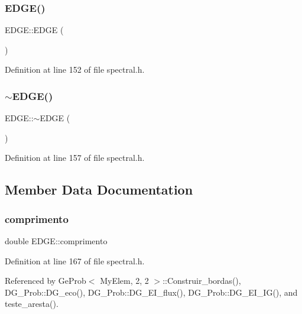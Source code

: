 \subsubsection{\texorpdfstring{E\+D\+G\+E()}{EDGE()}}
{\footnotesize\ttfamily E\+D\+G\+E\+::\+E\+D\+GE (\begin{DoxyParamCaption}{ }\end{DoxyParamCaption})\hspace{0.3cm}{\ttfamily [inline]}}



Definition at line 152 of file spectral.\+h.

\mbox{\label{structEDGE_a5a15e55729034ee840d2eac36fe3be23}} 
\subsubsection{\texorpdfstring{$\sim$\+E\+D\+G\+E()}{~EDGE()}}
{\footnotesize\ttfamily E\+D\+G\+E\+::$\sim$\+E\+D\+GE (\begin{DoxyParamCaption}{ }\end{DoxyParamCaption})\hspace{0.3cm}{\ttfamily [inline]}}



Definition at line 157 of file spectral.\+h.



\subsection{Member Data Documentation}
\mbox{\label{structEDGE_ab4b0765a9fd5095fd67820144a329a94}} 
\subsubsection{\texorpdfstring{comprimento}{comprimento}}
{\footnotesize\ttfamily double E\+D\+G\+E\+::comprimento}



Definition at line 167 of file spectral.\+h.



Referenced by Ge\+Prob$<$ My\+Elem, 2, 2 $>$\+::\+Construir\+\_\+bordas(), D\+G\+\_\+\+Prob\+::\+D\+G\+\_\+eco(), D\+G\+\_\+\+Prob\+::\+D\+G\+\_\+\+E\+I\+\_\+flux(), D\+G\+\_\+\+Prob\+::\+D\+G\+\_\+\+E\+I\+\_\+\+I\+G(), and teste\+\_\+aresta().

